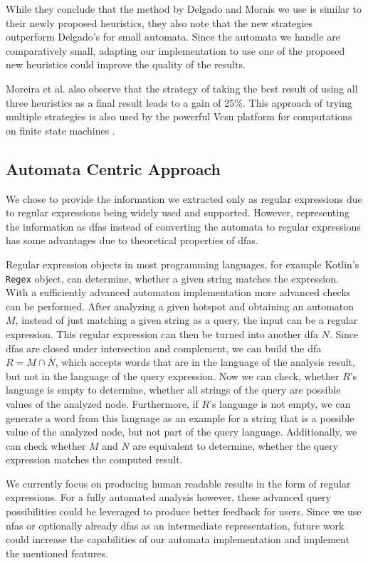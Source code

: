 While they conclude that the method by Delgado and Morais \cite{delgado} we use is similar to their newly proposed heuristics, they also note that the new strategies outperform Delgado's for small automata. Since the automata we handle are comparatively small, adapting our implementation to use one of the proposed new heuristics could improve the quality of the results.

Moreira et al. also observe that the strategy of taking the best result of using all three heuristics as a final result leads to a gain of 25\%. This approach of trying multiple strategies is also used by the powerful Vcsn platform for computations on finite state machines \cite{vcsn}.

\subsection{Automata Centric Approach}

We chose to provide the information we extracted only as regular expressions due to regular expressions being widely used and supported.
However, representing the information as \acp{dfa} instead of converting the automata to regular expressions has some advantages due to theoretical properties of \acp{dfa}.

Regular expression objects in most programming languages, for example Kotlin's \lstinline|Regex| object, can determine, whether a given string matches the expression. With a sufficiently advanced automaton implementation more advanced checks can be performed.
After analyzing a given hotspot and obtaining an automaton $M$, instead of just matching a given string as a query, the input can be a regular expression. This regular expression can then be turned into another \ac{dfa} $N$.
Since \acp{dfa} are closed under intersection and complement, we can build the \ac{dfa} $R = M \cap \overline{N}$, which accepts words that are in the language of the analysis result, but not in the language of the query expression.
Now we can check, whether $R$'s language is empty to determine, whether all strings of the query are possible values of the analyzed node. Furthermore, if $R$'s language is not empty, we can generate a word from this language as an example for a string that is a possible value of the analyzed node, but not part of the query language.
Additionally, we can check whether $M$ and $N$ are equivalent to determine, whether the query expression matches the computed result.

We currently focus on producing human readable results in the form of regular expressions. For a fully automated analysis however, these advanced query possibilities could be leveraged to produce better feedback for users.
Since we use \acp{nfa} or optionally already \acp{dfa} as an intermediate representation, future work could increase the capabilities of our automata implementation and implement the mentioned features.

